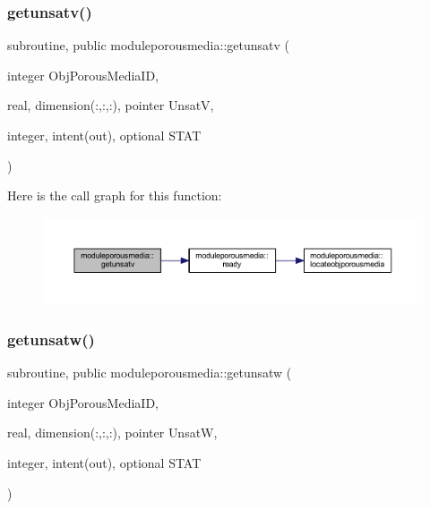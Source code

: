 \subsubsection{\texorpdfstring{getunsatv()}{getunsatv()}}
{\footnotesize\ttfamily subroutine, public moduleporousmedia\+::getunsatv (\begin{DoxyParamCaption}\item[{integer}]{Obj\+Porous\+Media\+ID,  }\item[{real, dimension(\+:,\+:,\+:), pointer}]{UnsatV,  }\item[{integer, intent(out), optional}]{S\+T\+AT }\end{DoxyParamCaption})}

Here is the call graph for this function\+:\nopagebreak
\begin{figure}[H]
\begin{center}
\leavevmode
\includegraphics[width=350pt]{namespacemoduleporousmedia_ae1e42504208d748be9b82e97810025bf_cgraph}
\end{center}
\end{figure}
\mbox{\label{namespacemoduleporousmedia_a34b7f3e33813dc9217457bf375eb5d30}} 
\subsubsection{\texorpdfstring{getunsatw()}{getunsatw()}}
{\footnotesize\ttfamily subroutine, public moduleporousmedia\+::getunsatw (\begin{DoxyParamCaption}\item[{integer}]{Obj\+Porous\+Media\+ID,  }\item[{real, dimension(\+:,\+:,\+:), pointer}]{UnsatW,  }\item[{integer, intent(out), optional}]{S\+T\+AT }\end{DoxyParamCaption})}

